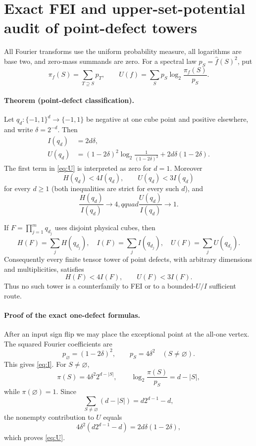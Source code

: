 \section*{Exact FEI and upper-set-potential audit of point-defect towers}

All Fourier transforms use the uniform probability measure, all logarithms
are base two, and zero-mass summands are zero.  For a spectral law
$p_S=\widehat f(S)^2$, put
\[
 \pi_f(S)=\sum_{T\supseteq S}p_T,
 \qquad
 U(f)=\sum_S p_S\log_2\frac{\pi_f(S)}{p_S}.
\]

\paragraph{Theorem (point-defect classification).}
Let $q_d:\{-1,1\}^d\to\{-1,1\}$ be negative at one cube point and
positive elsewhere, and write $\delta=2^{-d}$.  Then
\begin{align}
 I(q_d)&=2d\delta,\label{eq:I}\\
 U(q_d)&=(1-2\delta)^2
   \log_2\frac1{(1-2\delta)^2}
   +2d\delta(1-2\delta).\label{eq:U}
\end{align}
The first term in \eqref{eq:U} is interpreted as zero for $d=1$.  Moreover
\[
 H(q_d)<4I(q_d),\qquad U(q_d)<3I(q_d)                 \tag{3}
\]
for every $d\ge1$ (both inequalities are strict for every such $d$),
and
\[
 \frac{H(q_d)}{I(q_d)}\longrightarrow4,qquad
 \frac{U(q_d)}{I(q_d)}\longrightarrow1.              \tag{4}
\]

If $F=\prod_{j=1}^m q_{d_j}$ uses disjoint physical cubes, then
\[
 H(F)=\sum_jH(q_{d_j}),\quad I(F)=\sum_jI(q_{d_j}),
 \quad U(F)=\sum_jU(q_{d_j}).                          \tag{5}
\]
Consequently every finite tensor tower of point defects, with arbitrary
dimensions and multiplicities, satisfies
\[
 H(F)<4I(F),\qquad U(F)<3I(F).                         \tag{6}
\]
Thus no such tower is a counterfamily to FEI or to a bounded-$U/I$
sufficient route.

\paragraph{Proof of the exact one-defect formulas.}
After an input sign flip we may place the exceptional point at the all-one
vertex.  The squared Fourier coefficients are
\[
 p_\varnothing=(1-2\delta)^2,
 \qquad p_S=4\delta^2\quad(S\ne\varnothing).
\]
This gives \eqref{eq:I}.  For $S\ne\varnothing$,
\[
 \pi(S)=4\delta^2 2^{d-|S|},
 \qquad \log_2\frac{\pi(S)}{p_S}=d-|S|,
\]
while $\pi(\varnothing)=1$.  Since
\[
 \sum_{S\ne\varnothing}(d-|S|)=d2^{d-1}-d,
\]
the nonempty contribution to $U$ equals
\[
 4\delta^2(d2^{d-1}-d)=2d\delta(1-2\delta),
\]
which proves \eqref{eq:U}.

